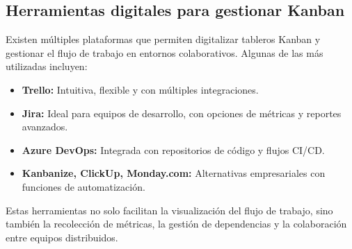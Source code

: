 \subsection{Herramientas digitales para gestionar Kanban}

Existen múltiples plataformas que permiten digitalizar tableros Kanban y gestionar el flujo de trabajo en entornos colaborativos. Algunas de las más utilizadas incluyen:

\begin{itemize}
    \item \textbf{Trello:} Intuitiva, flexible y con múltiples integraciones.
    \item \textbf{Jira:} Ideal para equipos de desarrollo, con opciones de métricas y reportes avanzados.
    \item \textbf{Azure DevOps:} Integrada con repositorios de código y flujos CI/CD.
    \item \textbf{Kanbanize, ClickUp, Monday.com:} Alternativas empresariales con funciones de automatización.
\end{itemize}

Estas herramientas no solo facilitan la visualización del flujo de trabajo, sino también la recolección de métricas, la gestión de dependencias y la colaboración entre equipos distribuidos.

